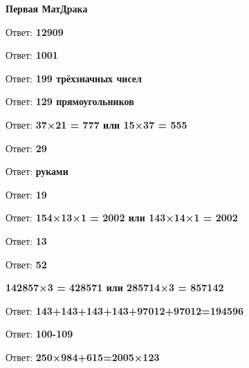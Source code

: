 \centerline{\bf \Huge Первая МатДрака}

 Ответ: \textbf{12909}

 Ответ: \textbf{1001}

 Ответ: \textbf{199 трёхзначных чисел}

 Ответ: \textbf{129 прямоугольников}

 Ответ: \textbf{37×21 = 777 или 15×37 = 555}

 Ответ: \textbf{29}

 Ответ: \textbf{руками}

 Ответ: \textbf{19}

 Ответ: \textbf{154×13×1 = 2002 или 143×14×1 = 2002}

 Ответ: \textbf{13}

 Ответ: \textbf{52}

 \textbf{142857×3 = 428571 или 285714×3 = 857142}

 Ответ: \textbf{143+143+143+143+97012+97012=194596}

 Ответ: \textbf{100-109}

 Ответ: \textbf{250×984+615=2005×123}

